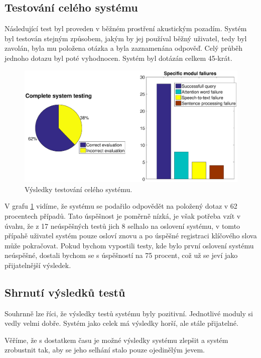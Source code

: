 \documentclass[12pt,a4paper]{article}
\begin{document}
\subsection{Testování celého systému}
Následující test byl proveden v běžném prostření akustickým pozadím. Systém byl testován stejným způsobem, jakým by jej používal běžný uživatel, tedy byl zavolán, byla mu položena otázka a byla zaznamenána odpověď. Celý průběh jednoho dotazu byl poté vyhodnocen. Systém byl dotázán celkem 45-krát.

\begin{figure}[ht]
	\begin{center}
		\includegraphics[width = 1\textwidth ]{full.eps}
		\caption{Výsledky testování celého systému.}
		\label{fig:full}
	\end{center}
\end{figure}

V grafu \ref{fig:full} vidíme, že systému se podařilo odpovědět na položený dotaz v 62 procentech případů. Tato úspěšnost je poměrně nízká, je však potřeba vzít v úvahu, že z 17 neúspěšných testů jich 8 selhalo na oslovení systému, v tomto přípahě uživatel systém pouze osloví znovu a po úspěšné registraci klíčového slova může pokračovat. Pokud bychom vypostili testy, kde bylo první oslovení systému neúspěšné, dostali bychom se s úspěšností na 75 procent, což už se jeví jako přijatelnější výsledek.

\subsection{Shrnutí výsledků testů}
Souhrnně lze říci, že výsledky testů systému byly pozitivní. Jednotlivé moduly si vedly velmi dobře. Systém jako celek má výsledky horší, ale stále přijatelné.

Věříme, že s dostatkem času je možné výsledky systému zlepšit a systém zrobustnit tak, aby se jeho selhání stalo pouze ojedinělým jevem.
\end{document}
